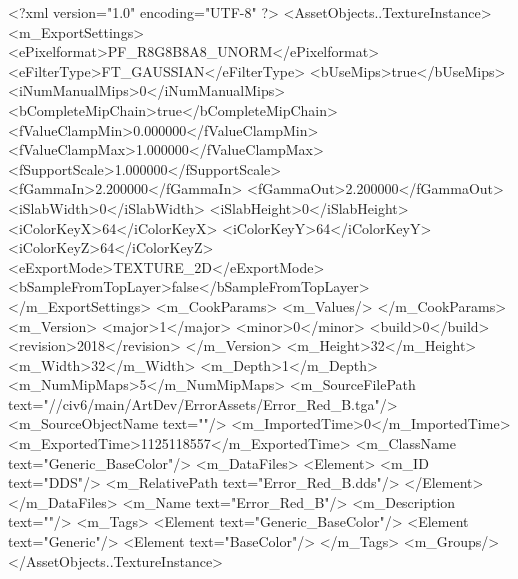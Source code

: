 <?xml version="1.0" encoding="UTF-8" ?>
<AssetObjects..TextureInstance>
	<m_ExportSettings>
		<ePixelformat>PF_R8G8B8A8_UNORM</ePixelformat>
		<eFilterType>FT_GAUSSIAN</eFilterType>
		<bUseMips>true</bUseMips>
		<iNumManualMips>0</iNumManualMips>
		<bCompleteMipChain>true</bCompleteMipChain>
		<fValueClampMin>0.000000</fValueClampMin>
		<fValueClampMax>1.000000</fValueClampMax>
		<fSupportScale>1.000000</fSupportScale>
		<fGammaIn>2.200000</fGammaIn>
		<fGammaOut>2.200000</fGammaOut>
		<iSlabWidth>0</iSlabWidth>
		<iSlabHeight>0</iSlabHeight>
		<iColorKeyX>64</iColorKeyX>
		<iColorKeyY>64</iColorKeyY>
		<iColorKeyZ>64</iColorKeyZ>
		<eExportMode>TEXTURE_2D</eExportMode>
		<bSampleFromTopLayer>false</bSampleFromTopLayer>
	</m_ExportSettings>
	<m_CookParams>
		<m_Values/>
	</m_CookParams>
	<m_Version>
		<major>1</major>
		<minor>0</minor>
		<build>0</build>
		<revision>2018</revision>
	</m_Version>
	<m_Height>32</m_Height>
	<m_Width>32</m_Width>
	<m_Depth>1</m_Depth>
	<m_NumMipMaps>5</m_NumMipMaps>
	<m_SourceFilePath text="//civ6/main/ArtDev/ErrorAssets/Error_Red_B.tga"/>
	<m_SourceObjectName text=""/>
	<m_ImportedTime>0</m_ImportedTime>
	<m_ExportedTime>1125118557</m_ExportedTime>
	<m_ClassName text="Generic_BaseColor"/>
	<m_DataFiles>
		<Element>
			<m_ID text="DDS"/>
			<m_RelativePath text="Error_Red_B.dds"/>
		</Element>
	</m_DataFiles>
	<m_Name text="Error_Red_B"/>
	<m_Description text=""/>
	<m_Tags>
		<Element text="Generic_BaseColor"/>
		<Element text="Generic"/>
		<Element text="BaseColor"/>
	</m_Tags>
	<m_Groups/>
</AssetObjects..TextureInstance>

